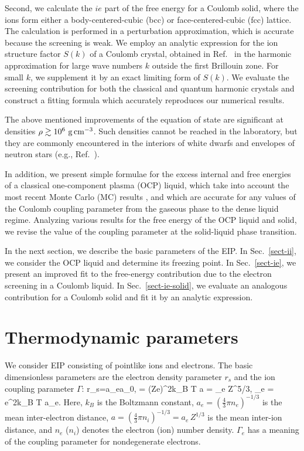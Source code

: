 Second,
we calculate the $ie$ part of the free energy for a Coulomb
solid, where the ions form either a body-centered-cubic (bcc)
or face-centered-cubic (fcc) lattice.
The calculation is performed in a perturbation 
approximation, which is accurate because 
the screening is weak. We employ an analytic 
expression for the ion structure factor $S(k)$
of a Coulomb crystal, obtained in Ref.\ \cite{BKPY} 
in the harmonic approximation 
for large wave numbers $k$ outside the first Brillouin zone.
For small $k$, we supplement it by an exact limiting
form of $S(k)$.
We evaluate the screening contribution for both the classical
and quantum harmonic crystals
and construct a fitting formula which accurately reproduces
our numerical results.

The above mentioned improvements of the equation of state
are significant at densities $\rho\gtrsim10^6{\rm~g\,cm}^{-3}$. 
Such densities cannot be reached in the laboratory,
but they are commonly encountered in the interiors of white dwarfs
and envelopes of neutron stars (e.g., Ref.~\cite{ShapiroTeukolsky}).

In addition, we present simple formulae
for the excess internal and free energies
of a classical one-component plasma (OCP) liquid,
which take into account the most recent Monte Carlo (MC)
results \cite{DWS,Caillol}, and which are accurate for any values
of the Coulomb coupling parameter from the gaseous phase
to the dense liquid regime.
Analyzing various results for the free energy 
of the OCP liquid and solid,
we revise the value of the coupling parameter at
the solid-liquid phase transition.

In the next section, we describe the basic parameters of the EIP.
In Sec.~\ref{sect-ii}, we consider 
the OCP liquid and determine its freezing point.
In Sec.~\ref{sect-ie}, we present an improved fit
to the free-energy contribution 
due to the electron screening in a Coulomb liquid.
In Sec.~\ref{sect-ie-solid}, we evaluate an analogous contribution
for a Coulomb solid and fit it by an analytic expression.

\section{Thermodynamic parameters}
\label{sect-param}
%
We consider EIP consisting of pointlike 
ions and electrons.
The basic dimensionless parameters are 
the electron density parameter $r_s$
and the ion coupling parameter $\Gamma$:
%
\beq 
   r_s={a_e\over a_0},
\quad
    \Gamma = {(Ze)^2\over k_B T a} = \Gamma_e Z^{5/3}, 
\quad  
    \Gamma_e = {e^2\over k_B T a_e}.
\eeq
%
Here, $k_B$ is the Boltzmann constant,
$a_e=(\frac43\pi n_e)^{-1/3}$
is the mean inter-electron distance, 
$a=(\frac43\pi n_i)^{-1/3}=a_e\,Z^{1/3}$
is the mean inter-ion distance,
and $n_e$ ($n_i$) denotes the electron (ion) number density.
$\Gamma_e$ has a meaning of the
coupling parameter for nondegenerate electrons.

